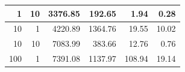 \documentclass[12pt,a4paper,twoside,openright]{report}
\begin{document}
\begin{table}[H]
\begin{tabular}{|r|r|r|r|r|r|}
1                                                                                               & 10                                                                                                                      & 3376.85                                                                                                                                    & 192.65                                                                                                                               & 1.94                                                                                                  & 0.28                                                                                                                               \\ \hline
10                                                                                              & 1                                                                                                                       & 4220.89                                                                                                                                    & 1364.76                                                                                                                              & 19.55                                                                                                 & 10.02                                                                                                                              \\ \hline
10                                                                                              & 10                                                                                                                      & 7083.99                                                                                                                                    & 383.66                                                                                                                               & 12.76                                                                                                 & 0.76                                                                                                                               \\ \hline
100                                                                                             & 1                                                                                                                       & 7391.08                                                                                                                                    & 1137.97                                                                                                                              & 108.94                                                                                                & 19.14                                                                                                                              \\ \hline

\end{tabular}
\end{table}
\end{document}
